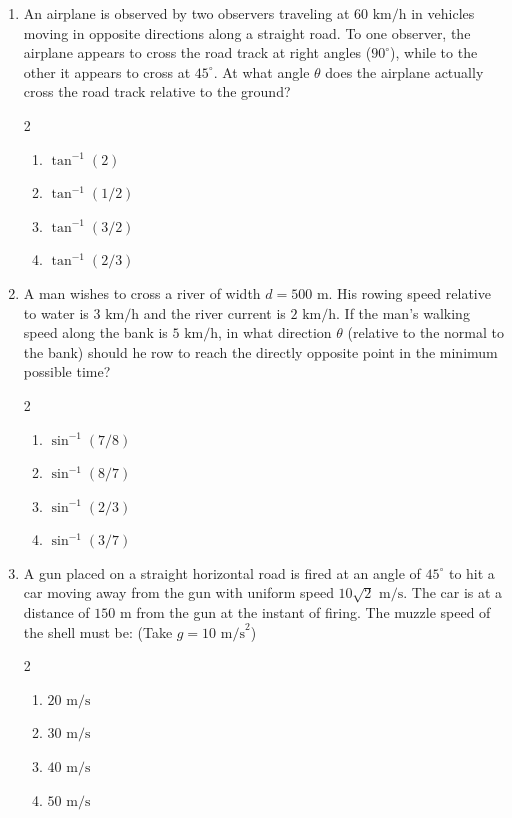 \documentclass[11pt,a4paper]{article}
\begin{document}
\begin{enumerate}[label=\textbf{\textcolor{l3Crimson}{Q\arabic*.}},leftmargin=24pt,itemsep=10pt,start=51]
  \item An airplane is observed by two observers traveling at $60\text{ km/h}$ in vehicles moving in opposite directions along a straight road. To one observer, the airplane appears to cross the road track at right angles ($90^\circ$), while to the other it appears to cross at $45^\circ$. At what angle $\theta$ does the airplane actually cross the road track relative to the ground?
  \begin{multicols}{2}
  \begin{enumerate}[label=\textbf{\textcolor{primaryDark}{(\Alph*)}},itemsep=2pt]
    \item $\tan^{-1}(2)$
    \item $\tan^{-1}(1/2)$
    \item $\tan^{-1}(3/2)$
    \item $\tan^{-1}(2/3)$
  \end{enumerate}
  \end{multicols}

  \item A man wishes to cross a river of width $d = 500\text{ m}$. His rowing speed relative to water is $3\text{ km/h}$ and the river current is $2\text{ km/h}$. If the man's walking speed along the bank is $5\text{ km/h}$, in what direction $\theta$ (relative to the normal to the bank) should he row to reach the directly opposite point in the minimum possible time?
  \begin{multicols}{2}
  \begin{enumerate}[label=\textbf{\textcolor{primaryDark}{(\Alph*)}},itemsep=2pt]
    \item $\sin^{-1}(7/8)$
    \item $\sin^{-1}(8/7)$
    \item $\sin^{-1}(2/3)$
    \item $\sin^{-1}(3/7)$
  \end{enumerate}
  \end{multicols}

  \item A gun placed on a straight horizontal road is fired at an angle of $45^\circ$ to hit a car moving away from the gun with uniform speed $10\sqrt{2}\text{ m/s}$. The car is at a distance of $150\text{ m}$ from the gun at the instant of firing. The muzzle speed of the shell must be: (Take $g = 10\text{ m/s}^2$)
  \begin{multicols}{2}
  \begin{enumerate}[label=\textbf{\textcolor{primaryDark}{(\Alph*)}},itemsep=2pt]
    \item $20\text{ m/s}$
    \item $30\text{ m/s}$
    \item $40\text{ m/s}$
    \item $50\text{ m/s}$
  \end{enumerate}
  \end{multicols}


\end{enumerate}
\end{document}
